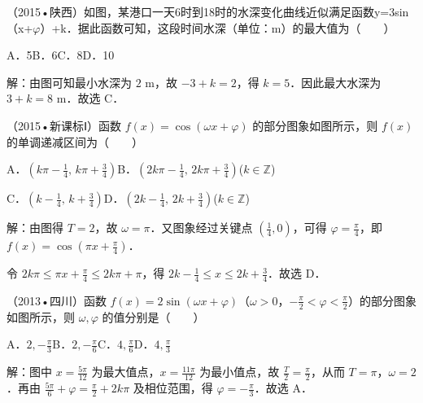 \begin{question}
（2015•陕西）如图，某港口一天6时到18时的水深变化曲线近似满足函数y=3sin（x+\ensuremath{\varphi}）+k．据此函数可知，这段时间水深（单位：m）的最大值为（　　）\par
{}\par
A．5\qquad{}B．6\qquad{}C．8\qquad{}D．10\par
\begin{solution}
解：由图可知最小水深为 $2$ m，故 $-3+k=2$，得 $k=5$．因此最大水深为 $3+k=8$ m．故选 C．\par
\end{solution}
\end{question}

\begin{question}
（2015•新课标Ⅰ）函数 $f(x)=\cos(\omega x+\varphi)$ 的部分图象如图所示，则 $f(x)$ 的单调递减区间为（　　）\par
A．$(k\pi-\frac14,\,k\pi+\frac34)$\quad B．$(2k\pi-\frac14,\,2k\pi+\frac34)$\quad($k\in\mathbb Z$)\par
C．$(k-\frac14,\,k+\frac34)$\quad D．$(2k-\frac14,\,2k+\frac34)$\quad($k\in\mathbb Z$)\par
\begin{solution}
解：由图得 $T=2$，故 $\omega=\pi$．又图象经过关键点 $(\frac14,0)$，可得 $\varphi=\frac{\pi}{4}$，即 $f(x)=\cos(\pi x+\frac{\pi}{4})$．\par
令 $2k\pi\leq\pi x+\frac{\pi}{4}\leq2k\pi+\pi$，得 $2k-\frac14\leq x\leq2k+\frac34$．故选 D．\par
\end{solution}
\end{question}

\begin{question}
（2013•四川）函数 $f(x)=2\sin(\omega x+\varphi)$（$\omega>0$，$-\frac{\pi}{2}<\varphi<\frac{\pi}{2}$）的部分图象如图所示，则 $\omega,\varphi$ 的值分别是（　　）\par
{}\par
A．$2,-\frac{\pi}{3}$\qquad B．$2,-\frac{\pi}{6}$\qquad C．$4,\frac{\pi}{6}$\qquad D．$4,\frac{\pi}{3}$\par
\begin{solution}
解：图中 $x=\frac{5\pi}{12}$ 为最大值点，$x=\frac{11\pi}{12}$ 为最小值点，故 $\frac T2=\frac{\pi}{2}$，从而 $T=\pi$，$\omega=2$．再由 $\frac{5\pi}{6}+\varphi=\frac{\pi}{2}+2k\pi$ 及相位范围，得 $\varphi=-\frac{\pi}{3}$．故选 A．\par
\end{solution}
\end{question}

